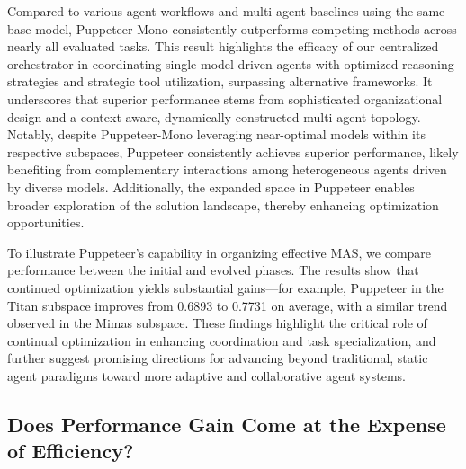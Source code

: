 \documentclass{article}
\begin{document}
Compared to various agent workflows and multi-agent baselines using the same base model, Puppeteer-Mono consistently outperforms competing methods across nearly all evaluated tasks. This result highlights the efficacy of our centralized orchestrator in coordinating single-model-driven agents with optimized reasoning strategies and strategic tool utilization, surpassing alternative frameworks. It underscores that superior performance stems from sophisticated organizational design and a context-aware, dynamically constructed multi-agent topology.
Notably, despite Puppeteer-Mono leveraging near-optimal models within its respective subspaces, Puppeteer consistently achieves superior performance, likely benefiting from complementary interactions among heterogeneous agents driven by diverse models. Additionally, the expanded space in Puppeteer enables broader exploration of the solution landscape, thereby enhancing optimization opportunities.

To illustrate Puppeteer’s capability in organizing effective MAS, we compare performance between the initial and evolved phases. The results show that continued optimization yields substantial gains—for example, Puppeteer in the Titan subspace improves from 0.6893 to 0.7731 on average, with a similar trend observed in the Mimas subspace. These findings highlight the critical role of continual optimization in enhancing coordination and task specialization, and further suggest promising directions for advancing beyond traditional, static agent paradigms toward more adaptive and collaborative agent systems.

\subsection{Does Performance Gain Come at the Expense of Efficiency?}
\end{document}
